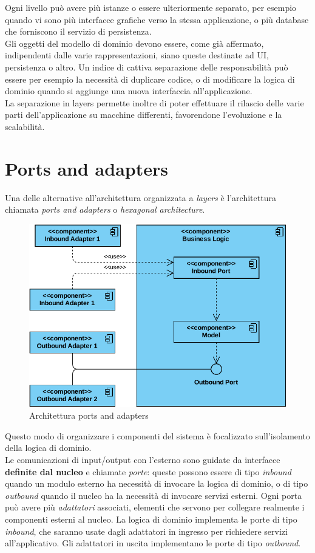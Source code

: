 Ogni livello può avere più istanze o essere ulteriormente separato, per esempio quando vi sono più interfacce grafiche verso la stessa applicazione, o più database che forniscono il servizio di persistenza.\\
Gli oggetti del modello di dominio devono essere, come già affermato, indipendenti dalle varie rappresentazioni, siano queste destinate ad UI, persistenza o altro.
Un indice di cattiva separazione delle responsabilità può essere per esempio la necessità di duplicare codice, o di modificare la logica di dominio quando si aggiunge una nuova interfaccia all'applicazione.\\
La separazione in layers permette inoltre di poter effettuare il rilascio delle varie parti dell'applicazione su macchine differenti, favorendone l'evoluzione e la scalabilità.
\section{Ports and adapters}

Una delle alternative all'architettura organizzata a \textit{layers} è l'architettura chiamata \textit{ports and adapters} o \textit{hexagonal architecture}\cite{microservices_architecture}.

\begin{figure}[h]
	\centering
	\includegraphics[scale=0.5]{img/hexagonal-component-diagram}
	\caption{Architettura ports and adapters}
	\label{fig:hexagonal-architecture}
\end{figure}

Questo modo di organizzare i componenti del sistema è focalizzato sull'isolamento della logica di dominio.\\
Le comunicazioni di input/output con l'esterno sono guidate da interfacce \textbf{definite dal nucleo} e chiamate \textit{porte}: queste possono essere di tipo \textit{inbound} quando un modulo esterno ha necessità di invocare la logica di dominio, o di tipo \textit{outbound} quando il nucleo ha la necessità di invocare servizi esterni.
Ogni porta può avere più \textit{adattatori} associati, elementi che servono per collegare realmente i componenti esterni al nucleo.
La logica di dominio implementa le porte di tipo \textit{inbound}, che saranno usate dagli adattatori in ingresso per richiedere servizi all'applicativo.
Gli adattatori in uscita implementano le porte di tipo \textit{outbound}.


